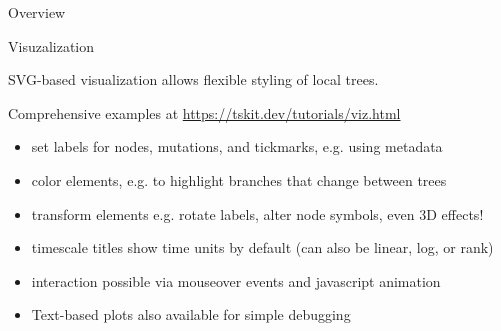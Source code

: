 \documentclass[landscape,a0paper,fontscale=0.4]{baposter}
\newcommand{\compresslist}{%
 \setlength{\itemsep}{1pt}%
 \setlength{\parskip}{0pt}%
 \setlength{\parsep}{0pt}%
 }
\begin{document}
\begin{poster}
\begin{posterbox}[name=overview,column=1,row=0,span=2]{Overview}
\end{posterbox}

\begin{posterbox}[name=viz,column=1,row=0,span=2,below=overview]{Visuzalization}

SVG-based visualization allows flexible styling of local trees.

Comprehensive examples at \url{https://tskit.dev/tutorials/viz.html}


% 
% 

\begin{multicols}{2}

\begin{itemize} \compresslist
    \item set labels for nodes, mutations, and tickmarks, e.g. using metadata
    \item color elements, e.g. to highlight branches that change between trees
    \item transform elements e.g. rotate labels, alter node symbols, even 3D effects!
    \item timescale titles show time units by default (can also be linear, log, or rank)
    \item interaction possible via mouseover events and javascript animation
    \item Text-based plots also available for simple debugging
\end{itemize}

% 
% 


\end{multicols}
\end{posterbox}
\end{poster}
\end{document}
